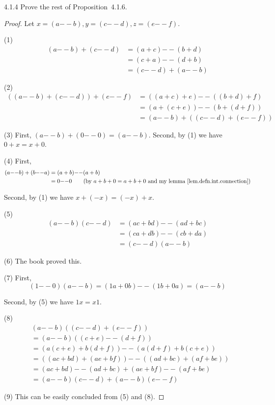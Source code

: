 \begin{exercise}{4.1.4}
	Prove the rest of Proposition~4.1.6.
\end{exercise}
\begin{proof}
Let $x=(a{--}b),y=(c{--}d),z=(e{--}f)$.

(1)
\begin{align*}
(a{--}b) + (c{--}d) 
&= (a+c) {--} (b+d) \\
&= (c+a) {--} (d+b) \\
&= (c{--}d) + (a{--}b)
\end{align*}

(2)
\begin{align*}
((a{--}b) + (c{--}d)) + (e{--}f)
&= ((a+c)+e) {--} ((b+d)+f) \\
&= (a+(c+e)) {--} (b+(d+f)) \\
&= (a{--}b) + ((c{--}d) + (e{--}f))
\end{align*}

(3)
First,
$
(a{--}b) + (0{--}0) = (a{--}b)
$.
Second, by (1) we have $0+x=x+0$.

(4)
First, 
\begin{align*}
(a{--}b) + (b{--}a) 
&= (a+b) {--} (a+b) \\
&= 0 {--} 0 \tag{by $a+b+0=a+b+0$ and my lemma~\ref{lem.defn.int.connection}}
\end{align*}

Second, by (1) we have $x+(-x) = (-x) + x$.

(5)
\begin{align*}
(a{--}b)(c{--}d)
&= (ac + bd) {--} (ad + bc) \\
&= (ca + db) {--} (cb + da) \\
&= (c{--}d)(a{--}b)
\end{align*}

(6)
The book proved this.

(7)
First,
\[
(1{--}0)(a{--}b) = (1a + 0b) {--} (1b+0a) = (a{--}b)
\]

Second, by (5) we have $1x=x1$.

(8)
\begin{align*}
&(a{--}b)((c{--}d)+(e{--}f)) \\
&= (a{--}b)((c+e){--}(d+f)) \\
&= (a(c+e) + b(d+f)) {--} (a(d+f) + b(c+e)) \\
&= ((ac + bd)+(ae + bf)) {--} ((ad + bc)+(af + be)) \\
&= (ac+bd){--}(ad+bc) + (ae+bf){--}(af+be) \\
&= (a{--}b)(c{--}d) + (a{--}b)(e{--}f)
\end{align*}

(9)
This can be easily concluded from (5) and (8).
\end{proof}

